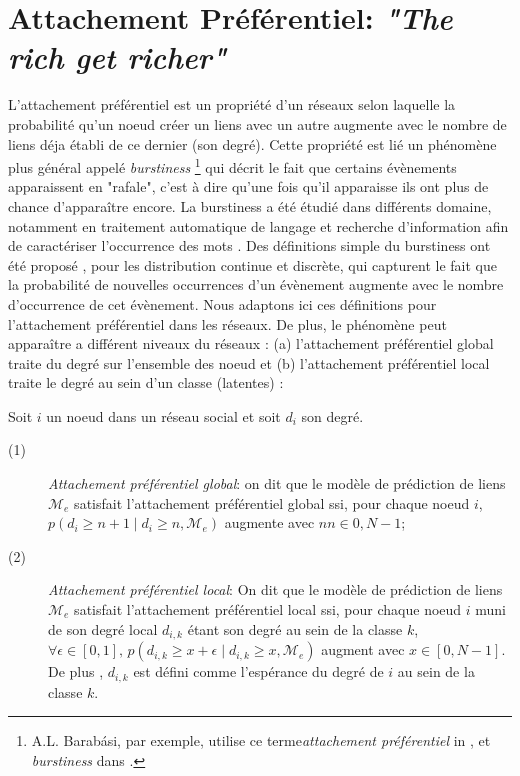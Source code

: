 \documentclass[french]{hermes-journal}
\newcommand{\pr}{p}
\begin{document}
\section{Attachement Préférentiel: \emph{"The rich get richer"}}
\label{sec:burstiness}


L'attachement préférentiel est un propriété d'un réseaux selon laquelle la probabilité qu'un noeud créer un liens avec un autre augmente avec le nombre de liens déja établi de ce dernier (son degré). Cette propriété est lié un phénomène plus général appelé \textit{burstiness} \footnote{A.L. Barab\'asi, par exemple, utilise ce terme\textit{attachement préférentiel} in \cite{barabasi1999emergence}, et \textit{burstiness} dans \cite{barabasi_burst}.} qui décrit le fait que certains évènements apparaissent en "rafale", c'est à dire qu'une fois qu'il apparaisse ils ont plus de chance d'apparaître encore. La burstiness a été étudié dans différents domaine, notamment en traitement automatique de langage et recherche d'information afin de caractériser l'occurrence des mots \cite{church1995poisson}. Des définitions simple du burstiness ont été proposé \cite{clinchant2008bnb,clinchant2010information}, pour les distribution continue et discrète, qui capturent le fait que la probabilité de nouvelles occurrences d'un évènement augmente avec le nombre d'occurrence de cet évènement. Nous adaptons ici ces définitions pour l'attachement préférentiel dans les réseaux. De plus, le phénomène peut apparaître a différent niveaux du réseaux : (a) l'attachement préférentiel global traite du degré sur l'ensemble des noeud et (b) l'attachement préférentiel local traite le degré au sein d'un classe (latentes) : 


\begin{definition}
Soit $i$ un noeud dans un réseau social et soit $d_i$ son degré.
\begin{description}
    \item[(1)] \emph{Attachement préférentiel global}: on dit que le modèle de prédiction de liens $\mathcal{M}_e$ satisfait l'attachement préférentiel global ssi, pour chaque noeud $i$, $\pr(d_i \ge n+1 \mid d_i \ge n, \mathcal{M}_e)$ augmente avec $n n \in {0, N-1}$;
 \item[(2)] \emph{Attachement préférentiel local}: On dit que le modèle de prédiction de liens  $\mathcal{M}_e$ satisfait l'attachement préférentiel local ssi, pour chaque noeud $i$ muni de son degré local $d_{i,k}$ étant son degré au sein de la classe $k$, $\forall \epsilon \in [0,1], \, \pr(d_{i,k} \ge x+\epsilon \mid d_{i,k} \ge x, \mathcal{M}_e)$  augment avec $x \in [0,N-1]$. De plus , $d_{i,k}$ est défini comme l'espérance du degré de $i$ au sein de la classe $k$.
\end{description}
\label{def:burst-soc-net}
\end{definition}
\end{document}
